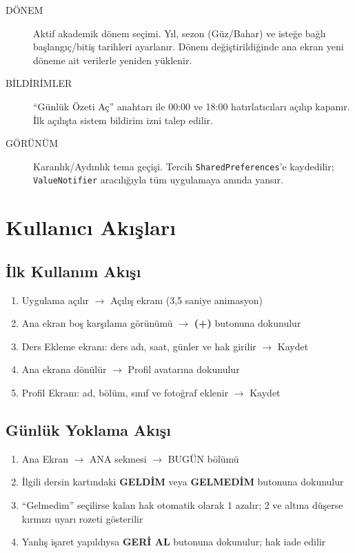 \documentclass[12pt,a4paper]{article}
\begin{document}
\begin{description}
    \item[DÖNEM] Aktif akademik dönem seçimi. Yıl, sezon (Güz/Bahar) ve isteğe bağlı başlangıç/bitiş tarihleri ayarlanır. Dönem değiştirildiğinde ana ekran yeni döneme ait verilerle yeniden yüklenir.
    \item[BİLDİRİMLER] ``Günlük Özeti Aç'' anahtarı ile 00:00 ve 18:00 hatırlatıcıları açılıp kapanır. İlk açılışta sistem bildirim izni talep edilir.
    \item[GÖRÜNÜM] Karanlık/Aydınlık tema geçişi. Tercih \texttt{SharedPreferences}'e kaydedilir; \texttt{ValueNotifier} aracılığıyla tüm uygulamaya anında yansır.
\end{description}

\section{Kullanıcı Akışları}

\subsection{İlk Kullanım Akışı}
\begin{enumerate}
    \item Uygulama açılır $\rightarrow$ Açılış ekranı (3,5 saniye animasyon)
    \item Ana ekran boş karşılama görünümü $\rightarrow$ \textbf{(+)} butonuna dokunulur
    \item Ders Ekleme ekranı: ders adı, saat, günler ve hak girilir $\rightarrow$ Kaydet
    \item Ana ekrana dönülür $\rightarrow$ Profil avatarına dokunulur
    \item Profil Ekranı: ad, bölüm, sınıf ve fotoğraf eklenir $\rightarrow$ Kaydet
\end{enumerate}

\subsection{Günlük Yoklama Akışı}
\begin{enumerate}
    \item Ana Ekran $\rightarrow$ ANA sekmesi $\rightarrow$ BUGÜN bölümü
    \item İlgili dersin kartındaki \textbf{GELDİM} veya \textbf{GELMEDİM} butonuna dokunulur
    \item ``Gelmedim'' seçilirse kalan hak otomatik olarak 1 azalır; 2 ve altına düşerse kırmızı uyarı rozeti gösterilir
    \item Yanlış işaret yapıldıysa \textbf{GERİ AL} butonuna dokunulur; hak iade edilir
\end{enumerate}
\end{document}
